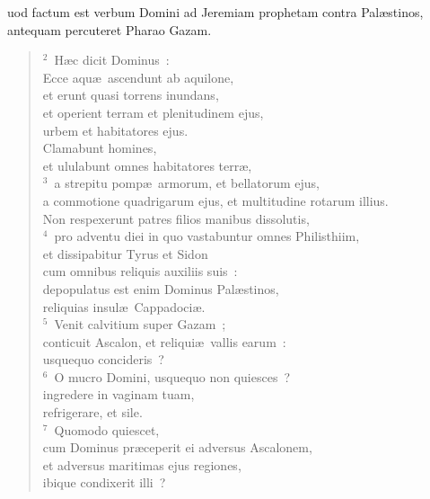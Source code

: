 \bchapter
{}uod factum est verbum Domini ad Jeremiam prophetam contra Pal\ae stinos, antequam percuteret Pharao Gazam.
\begin{flushleft}\begin{verse}\vspace{6pt}${}^{2}$~H\ae c dicit Dominus~:\\ Ecce aqu\ae\ ascendunt ab aquilone,\\ et erunt quasi torrens inundans,\\ et operient terram et plenitudinem ejus,\\ urbem et habitatores ejus.\\ Clamabunt homines,\\ et ululabunt omnes habitatores terr\ae ,\\
${}^{3}$~a strepitu pomp\ae\ armorum, et bellatorum ejus,\\ a commotione quadrigarum ejus, et multitudine rotarum illius.\\ Non respexerunt patres filios manibus dissolutis,\\
${}^{4}$~pro adventu diei in quo vastabuntur omnes Philisthiim,\\ et dissipabitur Tyrus et Sidon\\ cum omnibus reliquis auxiliis suis~:\\ depopulatus est enim Dominus Pal\ae stinos,\\ reliquias insul\ae\ Cappadoci\ae .\\
${}^{5}$~Venit calvitium super Gazam~;\\ conticuit Ascalon, et reliqui\ae\ vallis earum~:\\ usquequo concideris~?\\
${}^{6}$~O mucro Domini, usquequo non quiesces~?\\ ingredere in vaginam tuam,\\ refrigerare, et sile.\\
${}^{7}$~Quomodo quiescet,\\ cum Dominus pr\ae ceperit ei adversus Ascalonem,\\ et adversus maritimas ejus regiones,\\ ibique condixerit illi~?\end{verse}\end{flushleft}



